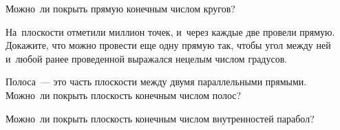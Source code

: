 \begin{problems}

\item
Можно~ли покрыть прямую конечным числом кругов?

\item
На~плоскости отметили миллион точек, и~через каждые две провели прямую.
Докажите, что можно провести еще одну прямую так, чтобы угол между ней
и~любой ранее проведенной выражался нецелым числом градусов.

\item
Полоса~--- это часть плоскости между двумя параллельными прямыми.
Можно~ли покрыть плоскость конечным числом полос?

\item
Можно~ли покрыть плоскость конечным числом внутренностей парабол?

\end{problems}

